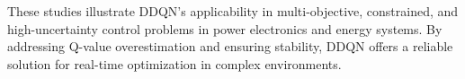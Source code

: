 



These studies illustrate DDQN's applicability in multi-objective, constrained, and high-uncertainty control problems in power electronics and energy systems. By addressing Q-value overestimation and ensuring stability, DDQN offers a reliable solution for real-time optimization in complex environments.

